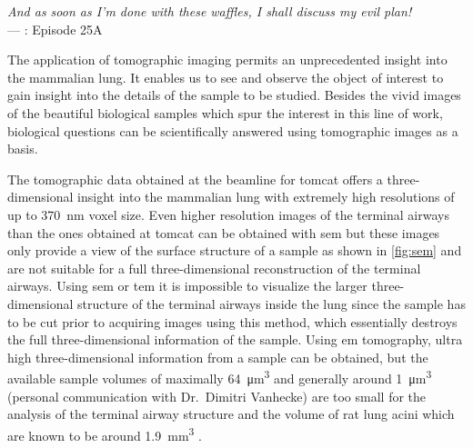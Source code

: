 \acresetall
{}\label{ch:discussion}
\begin{flushright}{\slshape And as soon as I'm done with these waffles, I shall discuss my evil plan!} \\ \medskip
	---  \citep{Zim}: Episode 25A
\end{flushright}
\vspace{6cm}

The application of tomographic imaging permits an unprecedented insight into the mammalian lung. It enables us to see and observe the object of interest to gain insight into the details of the sample to be studied. Besides the vivid images of the beautiful biological samples which spur the interest in this line of work, biological questions can be scientifically answered using tomographic images as a basis.

The tomographic data obtained at the beamline for \ac{tomcat} offers a three-dimensional insight into the mammalian lung with extremely high resolutions of up to \SI{370}{\nano\meter} voxel size. Even higher resolution images of the terminal airways than the ones obtained at \ac{tomcat} can be obtained with \ac{sem} but these images only provide a view of the surface structure of a sample as shown in \autoref{fig:sem} and are not suitable for a full three-dimensional reconstruction of the terminal airways. Using \ac{sem} or \ac{tem} it is impossible to visualize the larger three-dimensional structure of the terminal airways inside the lung since the sample has to be cut prior to acquiring images using this method, which essentially destroys the full three-dimensional information of the sample. Using \ac{em} tomography, ultra high three-dimensional information from a sample can be obtained, but the available sample volumes of maximally \SI{64}{\micro\meter\cubed} and generally around \SI{1}{\micro\meter\cubed} (personal communication with Dr.\ Dimitri Vanhecke) are too small for the analysis of the terminal airway structure and the volume of rat lung acini which are known to be around \SI{1.9}{\milli\meter\cubed} \cite{Rodriguez1987}.

